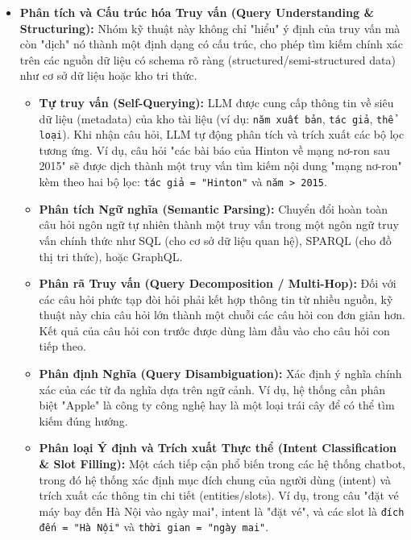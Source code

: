 \begin{itemize}
\begin{itemize}
        \item \textbf{Phân tích và Cấu trúc hóa Truy vấn (Query Understanding \& Structuring):} Nhóm kỹ thuật này không chỉ "hiểu" ý định của truy vấn mà còn "dịch" nó thành một định dạng có cấu trúc, cho phép tìm kiếm chính xác trên các nguồn dữ liệu có schema rõ ràng (structured/semi-structured data) như cơ sở dữ liệu hoặc kho tri thức.
        \begin{itemize}
            \item \textbf{Tự truy vấn (Self-Querying):} 
            LLM được cung cấp thông tin về siêu dữ liệu (metadata) của kho tài liệu (ví dụ: \texttt{năm xuất bản}, \texttt{tác giả}, \texttt{thể loại}). Khi nhận câu hỏi, LLM tự động phân tích và trích xuất các bộ lọc tương ứng. Ví dụ, câu hỏi "các bài báo của Hinton về mạng nơ-ron sau 2015" sẽ được dịch thành một truy vấn tìm kiếm nội dung "mạng nơ-ron" kèm theo hai bộ lọc: \texttt{tác giả = "Hinton"} và \texttt{năm > 2015}.
            
            \item \textbf{Phân tích Ngữ nghĩa (Semantic Parsing):} 
            Chuyển đổi hoàn toàn câu hỏi ngôn ngữ tự nhiên thành một truy vấn trong một ngôn ngữ truy vấn chính thức như SQL (cho cơ sở dữ liệu quan hệ), SPARQL (cho đồ thị tri thức), hoặc GraphQL.
            
            \item \textbf{Phân rã Truy vấn (Query Decomposition / Multi-Hop):} 
            Đối với các câu hỏi phức tạp đòi hỏi phải kết hợp thông tin từ nhiều nguồn, kỹ thuật này chia câu hỏi lớn thành một chuỗi các câu hỏi con đơn giản hơn. Kết quả của câu hỏi con trước được dùng làm đầu vào cho câu hỏi con tiếp theo.
            
            \item \textbf{Phân định Nghĩa (Query Disambiguation):} 
            Xác định ý nghĩa chính xác của các từ đa nghĩa dựa trên ngữ cảnh. Ví dụ, hệ thống cần phân biệt "Apple" là công ty công nghệ hay là một loại trái cây để có thể tìm kiếm đúng hướng.
            
            \item \textbf{Phân loại Ý định và Trích xuất Thực thể (Intent Classification \& Slot Filling):} 
            Một cách tiếp cận phổ biến trong các hệ thống chatbot, trong đó hệ thống xác định mục đích chung của người dùng (intent) và trích xuất các thông tin chi tiết (entities/slots). Ví dụ, trong câu "đặt vé máy bay đến Hà Nội vào ngày mai", intent là "đặt vé", và các slot là \texttt{đích đến = "Hà Nội"} và \texttt{thời gian = "ngày mai"}.
            

\end{itemize}
\end{itemize}
\end{itemize}
